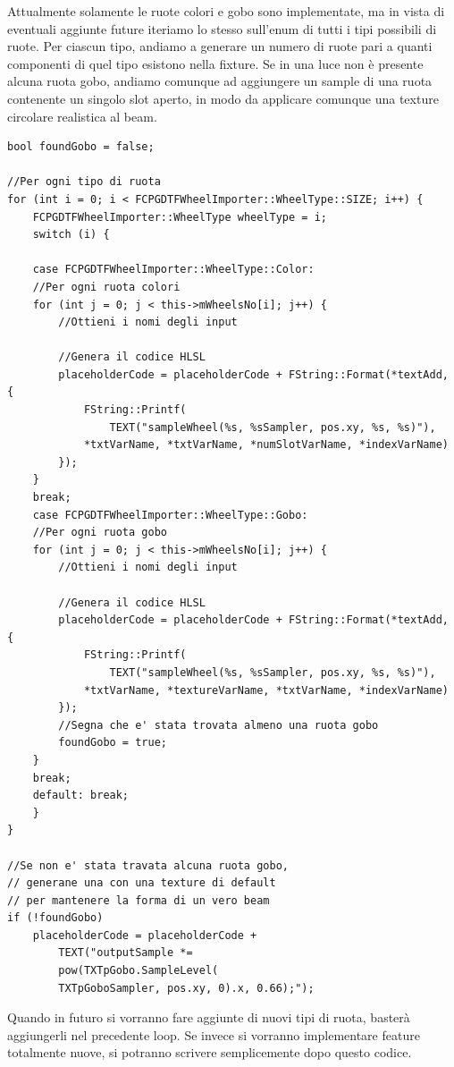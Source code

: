 \documentclass[main.tex]{subfiles}
\begin{document}
Attualmente solamente le ruote colori e gobo sono implementate, ma in vista di eventuali aggiunte future iteriamo lo stesso sull'enum di tutti i tipi possibili di ruote. Per ciascun tipo, andiamo a generare un numero di ruote pari a quanti componenti di quel tipo esistono nella fixture. Se in una luce non è presente alcuna ruota gobo, andiamo comunque ad aggiungere un sample di una ruota contenente un singolo slot aperto, in modo da applicare comunque una texture circolare realistica al beam.
\begin{lstlisting}
bool foundGobo = false;

//Per ogni tipo di ruota
for (int i = 0; i < FCPGDTFWheelImporter::WheelType::SIZE; i++) {
    FCPGDTFWheelImporter::WheelType wheelType = i;
    switch (i) {
    
    case FCPGDTFWheelImporter::WheelType::Color:
    //Per ogni ruota colori
    for (int j = 0; j < this->mWheelsNo[i]; j++) {
        //Ottieni i nomi degli input

        //Genera il codice HLSL
        placeholderCode = placeholderCode + FString::Format(*textAdd, {
            FString::Printf(
                TEXT("sampleWheel(%s, %sSampler, pos.xy, %s, %s)"),
            *txtVarName, *txtVarName, *numSlotVarName, *indexVarName)
        });
    }
    break;
    case FCPGDTFWheelImporter::WheelType::Gobo:
    //Per ogni ruota gobo
    for (int j = 0; j < this->mWheelsNo[i]; j++) {
        //Ottieni i nomi degli input
        
        //Genera il codice HLSL
        placeholderCode = placeholderCode + FString::Format(*textAdd, {
            FString::Printf(
                TEXT("sampleWheel(%s, %sSampler, pos.xy, %s, %s)"),
            *txtVarName, *textureVarName, *txtVarName, *indexVarName)
        });
        //Segna che e' stata trovata almeno una ruota gobo
        foundGobo = true;
    }
    break;
    default: break;
    }
}

//Se non e' stata travata alcuna ruota gobo,
// generane una con una texture di default
// per mantenere la forma di un vero beam
if (!foundGobo)
    placeholderCode = placeholderCode +
        TEXT("outputSample *=
        pow(TXTpGobo.SampleLevel(
        TXTpGoboSampler, pos.xy, 0).x, 0.66);");

\end{lstlisting}
Quando in futuro si vorranno fare aggiunte di nuovi tipi di ruota, basterà aggiungerli nel precedente loop. Se invece si vorranno implementare feature totalmente nuove, si potranno scrivere semplicemente dopo questo codice.\newline
\end{document}
